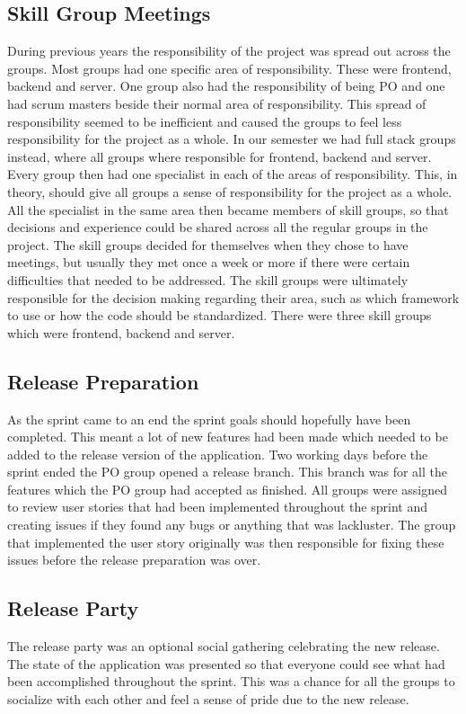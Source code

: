 \subsection{Skill Group Meetings}
During previous years the responsibility of the project was spread out across the groups.
Most groups had one specific area of responsibility.
These were frontend, backend and server.
One group also had the responsibility of being PO and one had scrum masters beside their normal area of responsibility.
This spread of responsibility seemed to be inefficient and caused the groups to feel less responsibility for the project as a whole.
\newline
\newline
In our semester we had full stack groups instead, where all groups where responsible for frontend, backend and server. Every group then had one specialist in each of the areas of responsibility.
This, in theory, should give all groups a sense of responsibility for the project as a whole.\\
All the specialist in the same area then became members of skill groups, so that decisions and experience could be shared across all the regular groups in the project.
The skill groups decided for themselves when they chose to have meetings, but usually they met once a week or more if there were certain difficulties that needed to be addressed.
The skill groups were ultimately responsible for the decision making regarding their area, such as which framework to use or how the code should be standardized.
There were three skill groups which were frontend, backend and server.

\subsection{Release Preparation}
As the sprint came to an end the sprint goals should hopefully have been completed.
This meant a lot of new features had been made which needed to be added to the release version of the application.
Two working days before the sprint ended the PO group opened a release branch.
This branch was for all the features which the PO group had accepted as finished.
All groups were assigned to review user stories that had been implemented throughout the sprint and creating issues if they found any bugs or anything that was lackluster.
The group that implemented the user story originally was then responsible for fixing these issues before the release preparation was over.

\subsection{Release Party}
The release party was an optional social gathering celebrating the new release. 
The state of the application was presented so that everyone could see what had been accomplished throughout the sprint.
This was a chance for all the groups to socialize with each other and feel a sense of pride due to the new release.

